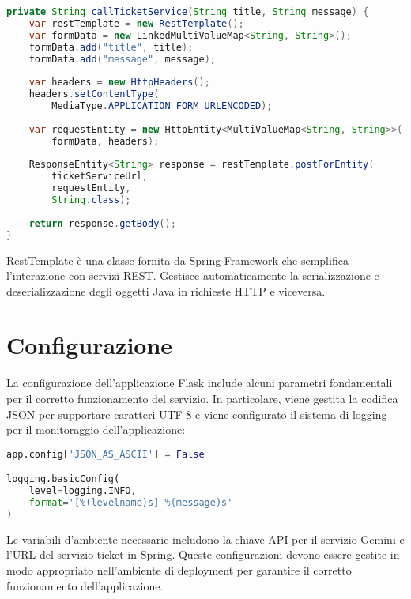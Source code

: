 \begin{lstlisting}[language=Java, caption=Codice Integrazione Spring]
private String callTicketService(String title, String message) {
    var restTemplate = new RestTemplate();
    var formData = new LinkedMultiValueMap<String, String>();
    formData.add("title", title);
    formData.add("message", message);
    
    var headers = new HttpHeaders();
    headers.setContentType(
        MediaType.APPLICATION_FORM_URLENCODED);
    
    var requestEntity = new HttpEntity<MultiValueMap<String, String>>(
        formData, headers);
    
    ResponseEntity<String> response = restTemplate.postForEntity(
        ticketServiceUrl, 
        requestEntity, 
        String.class);
    
    return response.getBody();
}
\end{lstlisting}

\begin{definition}[RestTemplate]
RestTemplate è una classe fornita da Spring Framework che semplifica l'interazione con servizi REST. Gestisce automaticamente la serializzazione e deserializzazione degli oggetti Java in richieste HTTP e viceversa.
\end{definition}

\section{Configurazione}
La configurazione dell'applicazione Flask include alcuni parametri fondamentali per il corretto funzionamento del servizio. In particolare, viene gestita la codifica JSON per supportare caratteri UTF-8 e viene configurato il sistema di logging per il monitoraggio dell'applicazione:

\begin{lstlisting}[language=Python, caption=Configurazione Base]
app.config['JSON_AS_ASCII'] = False

logging.basicConfig(
    level=logging.INFO,
    format='[%(levelname)s] %(message)s'
)
\end{lstlisting}

Le variabili d'ambiente necessarie includono la chiave API per il servizio Gemini e l'URL del servizio ticket in Spring. Queste configurazioni devono essere gestite in modo appropriato nell'ambiente di deployment per garantire il corretto funzionamento dell'applicazione.